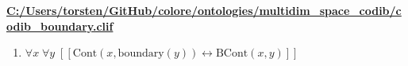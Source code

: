 \documentclass{article}
\begin{document}
\textbf{\url{C:/Users/torsten/GitHub/colore/ontologies/multidim\_space\_codib/codib\_boundary.clif}}

\begin{enumerate}
\item $\forall x\; \forall y\;  \left[ \left[ \textrm{Cont}(x,\textrm{boundary}(y)) \leftrightarrow \textrm{BCont}(x,y) \right] \right]$
\end{enumerate}
\end{document}
